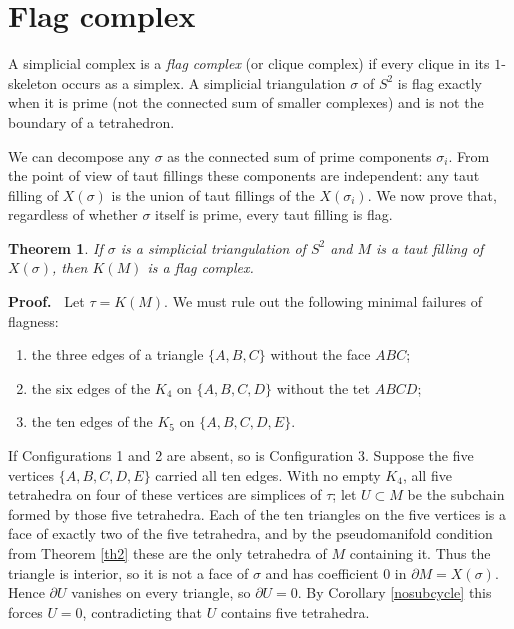 \documentclass[12pt]{article}
\newtheorem{theorem}{Theorem}
\newcommand{\proofstart}{{\noindent \bf Proof.\ }}
\def\del{\partial}
\begin{document}
\section{Flag complex}

A simplicial complex is a \emph{flag complex}
(or clique complex) if every clique in its $1$-skeleton occurs as a
simplex.
A simplicial triangulation $\sigma$ of $S^2$
is flag exactly when it is prime
(not the connected sum of smaller complexes)
and is not the boundary of a tetrahedron.

We can decompose any $\sigma$ as the connected sum of
prime components $\sigma_i$.
From the point of view of taut fillings these components are independent:
any taut filling of $X(\sigma)$ is the union of taut fillings of the
$X(\sigma_i)$.
We now prove that, regardless of whether $\sigma$ itself is prime,
every taut filling is flag.

\begin{theorem} \label{th4}
If $\sigma$ is a simplicial triangulation of $S^2$ and $M$ is a taut
filling of $X(\sigma)$, then $K(M)$ is a flag complex.
\end{theorem}

\proofstart
Let $\tau = K(M)$.
We must rule out the following minimal failures of flagness:
\begin{enumerate}
\item
the three edges of a triangle $\{A,B,C\}$ without the face $ABC$;
\item
the six edges of the $K_4$ on $\{A,B,C,D\}$ without the tet $ABCD$;
\item
the ten edges of the $K_5$ on $\{A,B,C,D,E\}$.
\end{enumerate}

If Configurations 1 and 2 are absent, so is Configuration 3.  Suppose the
five vertices $\{A,B,C,D,E\}$ carried all ten edges.  With no empty $K_4$,
all five tetrahedra on four of these vertices are simplices of $\tau$; let
$U \subset M$ be the subchain formed by those five tetrahedra.  Each of the
ten triangles on the five vertices is a face of exactly two of the five
tetrahedra, and by the pseudomanifold condition from Theorem \ref{th2} these are the
only tetrahedra of $M$ containing it. Thus the triangle is interior, so it is
not a face of $\sigma$ and has coefficient
$0$ in $\del M = X(\sigma)$.  Hence $\del U$ vanishes on every triangle, so
$\del U = 0$.  By Corollary \ref{nosubcycle} this forces $U = 0$,
contradicting that $U$ contains five tetrahedra.
\end{document}
